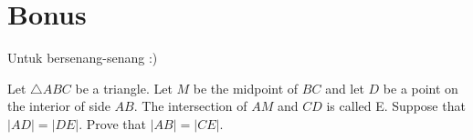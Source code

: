 \documentclass[11pt]{scrartcl}
\begin{document}
	\section{Bonus}
	Untuk bersenang-senang :)
	\begin{soalbaru}
	
	 Let $\triangle ABC$ be a triangle. Let $M$ be the midpoint of $BC$ and let $D$ be a point on the interior of side $AB$. The intersection of $AM$ and $CD$ is called E. Suppose that $|AD|=|DE|.$ Prove that $|AB|=|CE|.$
	
	
	\end{soalbaru}
\end{document}
